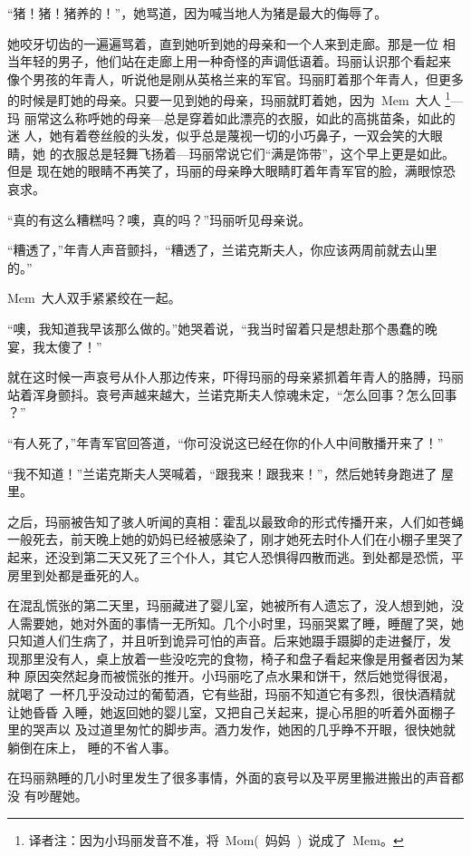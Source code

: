 \documentclass[winfonts,UTF8,cs4size,a4paper,hyperref,fancyhdr,fntef]{ctexbook}
\begin{document}
``猪！猪！猪养的！''，她骂道，因为喊当地人为猪是最大的侮辱了。

她咬牙切齿的一遍遍骂着，直到她听到她的母亲和一个人来到走廊。那是一位
相当年轻的男子，他们站在走廊上用一种奇怪的声调低语着。玛丽认识那个看起来
像个男孩的年青人，听说他是刚从英格兰来的军官。玛丽盯着那个年青人，但更多
的时候是盯她的母亲。只要一见到她的母亲，玛丽就盯着她，因为~Mem~大人
\footnote{译者注：因为小玛丽发音不准，将~Mom(~妈妈~)~说成了~Mem。}---玛
丽常这么称呼她的母亲---总是穿着如此漂亮的衣服，如此的高挑苗条，如此的迷
人，她有着卷丝般的头发，似乎总是蔑视一切的小巧鼻子，一双会笑的大眼睛，她
的衣服总是轻舞飞扬着---玛丽常说它们``满是饰带''，这个早上更是如此。但是
现在她的眼睛不再笑了，玛丽的母亲睁大眼睛盯着年青军官的脸，满眼惊恐哀求。

``真的有这么糟糕吗？噢，真的吗？''玛丽听见母亲说。

``糟透了，''年青人声音颤抖，``糟透了，兰诺克斯夫人，你应该两周前就去山里
的。''

Mem~大人双手紧紧绞在一起。

``噢，我知道我早该那么做的。''她哭着说，``我当时留着只是想赴那个愚蠢的晚
宴，我太傻了！''

就在这时候一声哀号从仆人那边传来，吓得玛丽的母亲紧抓着年青人的胳膊，玛丽
站着浑身颤抖。哀号声越来越大，兰诺克斯夫人惊魂未定，``怎么回事？怎么回事
？''

``有人死了，''年青军官回答道，``你可没说这已经在你的仆人中间散播开来了！''

``我不知道！''兰诺克斯夫人哭喊着，``跟我来！跟我来！''，然后她转身跑进了
屋里。

之后，玛丽被告知了骇人听闻的真相：霍乱以最致命的形式传播开来，人们如苍蝇
一般死去，前天晚上她的奶妈已经被感染了，刚才她死去时仆人们在小棚子里哭了
起来，还没到第二天又死了三个仆人，其它人恐惧得四散而逃。到处都是恐慌，平
房里到处都是垂死的人。

在混乱慌张的第二天里，玛丽藏进了婴儿室，她被所有人遗忘了，没人想到她，没
人需要她，她对外面的事情一无所知。几个小时里，玛丽哭累了睡，睡醒了哭，她
只知道人们生病了，并且听到诡异可怕的声音。后来她蹑手蹑脚的走进餐厅，发
现那里没有人，桌上放着一些没吃完的食物，椅子和盘子看起来像是用餐者因为某种
原因突然起身而被慌张的推开。小玛丽吃了点水果和饼干，然后她觉得很渴，就喝了
一杯几乎没动过的葡萄酒，它有些甜，玛丽不知道它有多烈，很快酒精就让她昏昏
入睡，她返回她的婴儿室，又把自己关起来，提心吊胆的听着外面棚子里的哭声以
及过道里匆忙的脚步声。酒力发作，她困的几乎睁不开眼，很快她就躺倒在床上，
睡的不省人事。

在玛丽熟睡的几小时里发生了很多事情，外面的哀号以及平房里搬进搬出的声音都没
有吵醒她。
\end{document}

